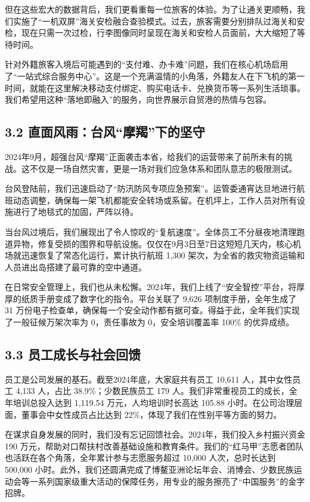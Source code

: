 \documentclass[a4paper,12pt]{article}
\begin{document}
但在这些宏大的数据背后，我们更看重每一位旅客的体验。为了让通关更顺畅，我们实施了“一机双屏”海关安检融合查验模式。过去，旅客需要分别排队过海关和安检，现在只需一次过检，行李图像同时呈现在海关和安检人员面前，大大缩短了等待时间。

针对外籍旅客入境后可能遇到的“支付难、办卡难”问题，我们在核心机场启用了“一站式综合服务中心”。这是一个充满温情的小角落，外籍友人在下飞机的第一时间，就能在这里解决移动支付绑定、购买电话卡、兑换货币等一系列生活琐事。我们希望用这种“落地即融入”的服务，向世界展示自贸港的热情与包容。

\subsection{3.2 直面风雨：台风“摩羯”下的坚守}

2024年9月，超强台风“摩羯”正面袭击本省，给我们的运营带来了前所未有的挑战。这不仅是一场自然灾害，更是一场对我们应急体系和团队意志的极限测试。

台风登陆前，我们迅速启动了“防汛防风专项应急预案”。运管委通宵达旦地进行航班动态调整，确保每一架飞机都能安全转场或系留。在机坪上，工作人员对所有设施进行了地毯式的加固，严阵以待。

当台风过境后，我们展现出了令人惊叹的“复航速度”。全体员工不分昼夜地清理跑道异物，修复受损的围界和导航设施。仅仅在9月3日至7日这短短几天内，核心机场就迅速恢复了常态化运行，累计执行航班 1,300 架次，为全省的救灾物资运输和人员进出岛搭建了最可靠的空中通道。

在日常安全管理上，我们也从未松懈。2024年，我们上线了“安全智控”平台，将厚厚的纸质手册变成了数字化的指令。平台关联了 9,626 项制度手册，全年生成了 31 万份电子检查单，确保每一个安全动作都有据可查。得益于此，全年我们实现了一般征候万架次率为 0，责任事故为 0，安全培训覆盖率 100\% 的优异成绩。

\subsection{3.3 员工成长与社会回馈}

员工是公司发展的基石。截至2024年底，大家庭共有员工 10,611 人，其中女性员工 4,133 人，占比 38.9\%；少数民族员工 179 人。我们非常重视员工的成长，全年培训总投入达到 1,119.54 万元，人均培训时长高达 105.88 小时。在公司治理层面，董事会中女性成员占比达到 22\%，体现了我们在性别平等方面的努力。

在谋求自身发展的同时，我们没有忘记回馈社会。2024年，我们投入乡村振兴资金 190 万元，帮助对口帮扶村改善基础设施和教育条件。我们的“红马甲”志愿者团队也活跃在各个角落，全年累计参与志愿服务超过 10,000 人次，总时长达到 500,000 小时。此外，我们还圆满完成了博鳌亚洲论坛年会、消博会、少数民族运动会等一系列国家级重大活动的保障任务，用专业的服务擦亮了“中国服务”的金字招牌。
\end{document}
